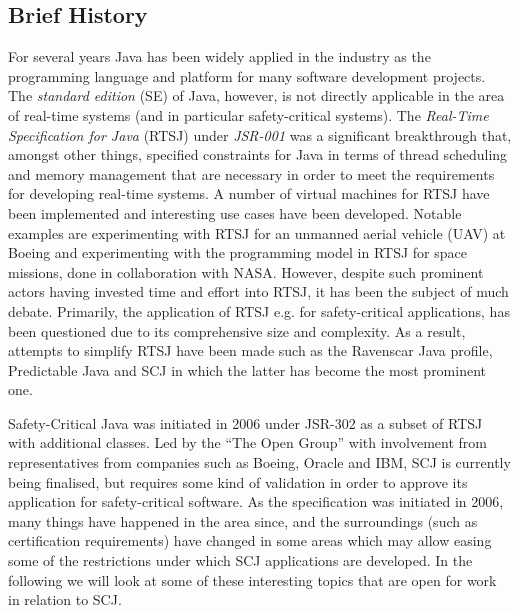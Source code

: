\subsection{Brief History} %
\label{sub:brief_history_of_java_for_safety_critical_systems}
For several years Java has been widely applied in the industry as the programming language and platform for many software development projects. The \textit{standard edition} (SE) of Java, however, is not directly applicable in the area of real-time systems (and in particular safety-critical systems). The \textit{Real-Time Specification for Java} (RTSJ) under \textit{JSR-001}\cite{alan2001real, henties:2009-20} was a significant breakthrough that, amongst other things, specified constraints for Java in terms of thread scheduling and memory management that are necessary in order to meet the requirements for developing real-time systems. A number of virtual machines for RTSJ have been implemented and interesting use cases have been developed. Notable examples are experimenting with RTSJ for an unmanned aerial vehicle (UAV) at Boeing\cite{Armbruster:2007:RJV:1324969.1324974} and experimenting with the programming model in RTSJ for space missions, done in collaboration with NASA\cite{DBLP:conf/isorc/DvorakBCCCGIMMR04}. However, despite such prominent actors having invested time and effort into RTSJ, it has been the subject of much debate. Primarily, the application of RTSJ e.g. for safety-critical applications, has been questioned due to its comprehensive size and complexity. As a result, attempts to simplify RTSJ have been made such as the Ravenscar Java profile\cite{Kwon:2002:RHI:583810.583825}, Predictable Java\cite{Bogholm:2009:PJP:1620405.1620427} and SCJ in which the latter has become the most prominent one.

Safety-Critical Java was initiated in 2006 under JSR-302 as a subset of RTSJ with additional classes\cite{Schoeberl:2012:SCJonJava}. Led by the ``The Open Group'' with involvement from representatives from companies such as Boeing, Oracle and IBM, SCJ is currently being finalised, but requires some kind of validation in order to approve its application for safety-critical software. As the specification was initiated in 2006, many things have happened in the area since, and the surroundings (such as certification requirements) have changed in some areas which may allow easing some of the restrictions under which SCJ applications are developed. In the following we will look at some of these interesting topics that are open for work in relation to SCJ.

